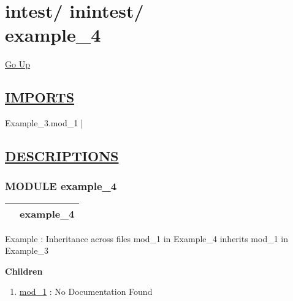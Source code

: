 \chapter*{\color{headfile}
{\large intest\slash\hspace{0pt}}
{\large inintest\slash\hspace{0pt}}
 \\
example_4
}
\hypertarget{ecldoc:toc:intest.inintest.example_4}{}
\hyperlink{ecldoc:toc:root/intest/inintest}{Go Up}

\section*{\underline{\textsf{IMPORTS}}}
\begin{doublespace}
{\large
Example\_3.mod\_1 |
}
\end{doublespace}

\section*{\underline{\textsf{DESCRIPTIONS}}}
\subsection*{\textsf{\colorbox{headtoc}{\color{white} MODULE}
example\_4}}

\hypertarget{ecldoc:intest.inintest.example_4}{}

{\renewcommand{\arraystretch}{1.5}
\begin{tabularx}{\textwidth}{|>{\raggedright\arraybackslash}l|X|}
\hline
\hspace{0pt}\mytexttt{\color{red} } & \textbf{example\_4} \\
\hline
\end{tabularx}
}

\par





Example : Inheritance across files mod\_1 in Example\_4 inherits mod\_1 in Example\_3







\textbf{Children}
\begin{enumerate}
\item \hyperlink{ecldoc:intest.inintest.example_4.mod_1}{mod\_1}
: No Documentation Found
\end{enumerate}

